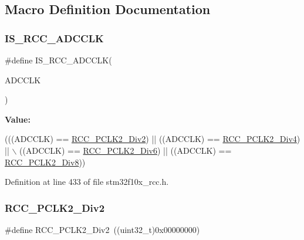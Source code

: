 \subsection{Macro Definition Documentation}
\mbox{\label{group___a_d_c__clock__source_ga6a9c4fb239566f0f3d44c8cc266e528b}} 
\subsubsection{\texorpdfstring{I\+S\+\_\+\+R\+C\+C\+\_\+\+A\+D\+C\+C\+LK}{IS\_RCC\_ADCCLK}}
{\footnotesize\ttfamily \#define I\+S\+\_\+\+R\+C\+C\+\_\+\+A\+D\+C\+C\+LK(\begin{DoxyParamCaption}\item[{}]{A\+D\+C\+C\+LK }\end{DoxyParamCaption})}

{\bfseries Value\+:}
\begin{DoxyCode}
(((ADCCLK) == \hyperlink{group___a_d_c__clock__source_ga6c341971f2f161320ad150faa3636b41}{RCC\_PCLK2\_Div2}) || ((ADCCLK) == \hyperlink{group___a_d_c__clock__source_gaecc7a9370fb7d7772d9c90888792084c}{RCC\_PCLK2\_Div4}) || \(\backslash\)
                               ((ADCCLK) == \hyperlink{group___a_d_c__clock__source_gaffb34a845f94f4ea741a45998d28deb3}{RCC\_PCLK2\_Div6}) || ((ADCCLK) == 
      \hyperlink{group___a_d_c__clock__source_ga77d5c803e2d31a806467bb7db9d24cd0}{RCC\_PCLK2\_Div8}))
\end{DoxyCode}


Definition at line 433 of file stm32f10x\+\_\+rcc.\+h.

\mbox{\label{group___a_d_c__clock__source_ga6c341971f2f161320ad150faa3636b41}} 
\subsubsection{\texorpdfstring{R\+C\+C\+\_\+\+P\+C\+L\+K2\+\_\+\+Div2}{RCC\_PCLK2\_Div2}}
{\footnotesize\ttfamily \#define R\+C\+C\+\_\+\+P\+C\+L\+K2\+\_\+\+Div2~((uint32\+\_\+t)0x00000000)}



